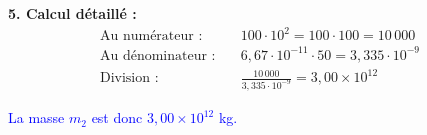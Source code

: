 \documentclass[answers]{exam}
\begin{document}
\begin{questions}
\begin{solution}
      \textbf{5. Calcul détaillé :}
      \begin{align*}
      \text{Au numérateur :} & \quad 100 \cdot 10^2 = 100 \cdot 100 = 10\,000 \\
      \text{Au dénominateur :} & \quad 6,67 \cdot 10^{-11} \cdot 50 = 3,335 \cdot 10^{-9} \\
      \text{Division :} & \quad \frac{10\,000}{3,335 \cdot 10^{-9}} = 3,00 \times 10^{12}
      \end{align*}
  
      \textcolor{blue}{La masse $m_2$ est donc $3,00 \times 10^{12}$ kg.}
    \end{solution}
  \end{questions}
\end{document}
